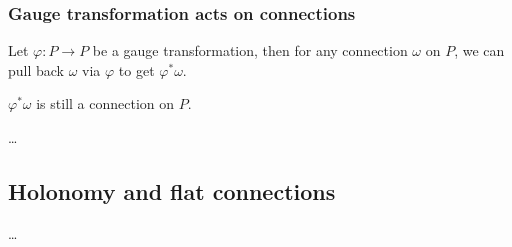 \subsubsection*{Gauge transformation acts on connections}
Let $\varphi: P \to P$ be a gauge transformation,
then for any connection $\omega$ on $P$, 
we can pull back $\omega$ via $\varphi$ to get $\varphi^* \omega$. 
\begin{theorem}
    $\varphi^* \omega$ is still a connection on $P$.
\end{theorem}
\dots
\subsection{Holonomy and flat connections}
\dots